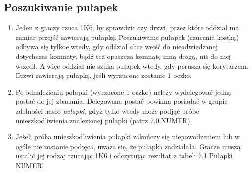 \subsection{Poszukiwanie pułapek}
\begin{enumerate}
    \item
        Jeden z graczy rzuca 1K6, by sprawdzic czy drzwi, przez które oddział ma zamiar przejść zawierają pułapkę.
        Poszukiwanie pułapek (rzucanie kostką) odbywa się tylkoe wtedy, gdy oddział chce wejść do nieodwiedzanej dotychczas komnaty, bądź też opuszcza komnątę inną drogą, niż do niej wszedł.
        A więc oddział nie szuka pułapek wtedy, gdy porusza się korytarzem.
        Drzwi zawierają pułapkę, jeśli wyrzucone zostanie 1 oczko.
    \item
        Po odnalezieniu połapki (wyrzucone 1 oczko) należy wydelegować jedną postać do jej zbadania.
        Delegowana postać powinna posiadać w grupie zdolności hasło \textit{pułapki}, gdyż tylko wtedy może podjąć próbe unieszkodliwienia znalezionej pułapki (patrz 7.0 NUMER).
    \item
        Jeżeli próba unieszkodliwienia pułapki zakończy się niepowodzeniem lub w ogóle nie zostanie podjęca, uważa się, że pułapka zadziałała.
        Gracze muszą ustalić jej rodzaj rzucając 1K6 i odczytując rezultat z tabeli 7.1 Pułapki NUMER!
\end{enumerate}

